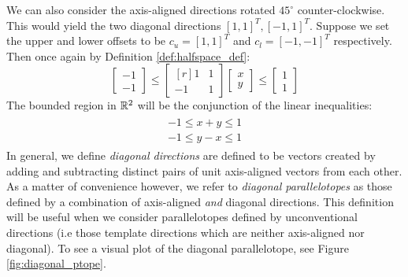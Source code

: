 \begin{example}
  \label{ex:simple_diag_ptope}
  We can also consider the axis-aligned directions rotated $45^\circ$ counter-clockwise. This would yield the two diagonal directions $[1,1]^T, [-1,1]^T$. Suppose we set the upper and lower offsets to be $c_u = [1,1]^T$ and $c_l = [-1,-1]^T$ respectively. Then once again by Definition \ref{def:halfspace_def}:
  \begin{equation}
  \begin{bmatrix}
    -1 \\ -1
  \end{bmatrix} \leq \begin{bmatrix*}[r]
      1 & 1 \\ -1 & 1
    \end{bmatrix*}\begin{bmatrix}
     x \\ y
    \end{bmatrix} \leq \begin{bmatrix}
      1 \\ 1
    \end{bmatrix}
  \end{equation}
  The bounded region in ${\mathbb{R}}^2$ will be the conjunction of the linear inequalities:
  \begin{align}
    \begin{split}
    -1 \leq x + y \leq 1 \\
    -1 \leq y - x \leq 1
    \end{split}
  \end{align}
  In general, we define \emph{diagonal directions} are defined to be vectors created by adding and subtracting distinct pairs of unit axis-aligned vectors from each other. As a matter of convenience however, we refer to \emph{diagonal parallelotopes} as those defined by a combination of axis-aligned \emph{and} diagonal directions. This definition will be useful when we consider parallelotopes defined by unconventional directions (i.e those template directions which are neither axis-aligned nor diagonal). To see a visual plot of the diagonal parallelotope, see Figure \ref{fig:diagonal_ptope}.


\end{example}
